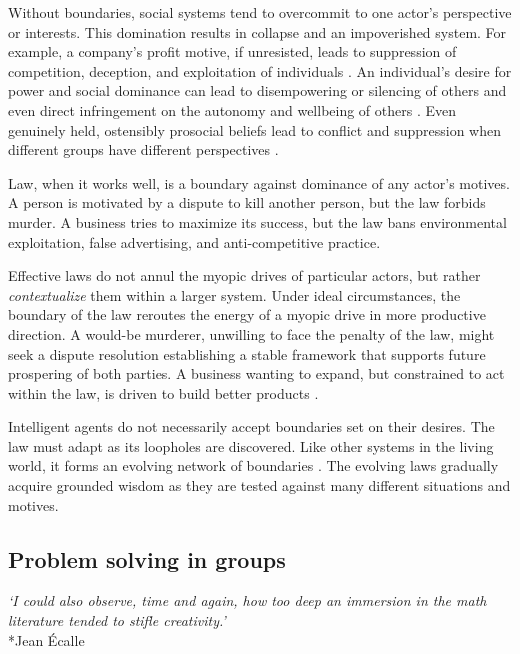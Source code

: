 \documentclass[12pt]{article}
\begin{document}
Without boundaries, social systems tend to overcommit to one actor's perspective or interests. This domination results in collapse and an impoverished system. For example, a company's profit motive, if unresisted, leads to suppression of competition, deception, and exploitation of individuals \citep{dalrymple2019anarchy, baran1966monopoly, goldacre2014bad, smith1776inquiry, bakan2006corporation}. An individual's desire for power and social dominance can lead to disempowering or silencing of others and even direct infringement on the autonomy and wellbeing of others \citep{hawley2003prosocial, tepper2000consequences, sidanius2001social}. Even genuinely held, ostensibly prosocial beliefs lead to conflict and suppression when different groups have different perspectives \citep{haidt2012righteous, scott1998seeing, greene2013moral}.

Law, when it works well, is a boundary against dominance of any actor's motives. A person is motivated by a dispute to kill another person, but the law forbids murder. A business tries to maximize its success, but the law bans environmental exploitation, false advertising, and anti-competitive practice. 

Effective laws do not annul the myopic drives of particular actors, but rather \textit{contextualize} them within a larger system. Under ideal circumstances, the boundary of the law reroutes the energy of a myopic drive in more productive direction. A would-be murderer, unwilling to face the penalty of the law, might seek a dispute resolution establishing a stable framework that supports future prospering of both parties. A business wanting to expand, but constrained to act within the law, is driven to build better products \citep{wu2011master, ashford1985using, ambec2013porter}. 

Intelligent agents do not necessarily accept boundaries set on their desires. The law must adapt as its loopholes are discovered. Like other systems in the living world, it forms an evolving network of boundaries \citep{campbell1979assessing, ordonez2009goals, kerr1975folly, burns2006impact}. The evolving laws gradually acquire grounded wisdom as they are tested against many different situations and motives.



\subsection{Problem solving in groups}

\begin{center}
\textit{`I could also observe, time and again, how too deep an immersion in the math literature tended to stifle creativity.'}\\*Jean Écalle
\end{center}
\end{document}
